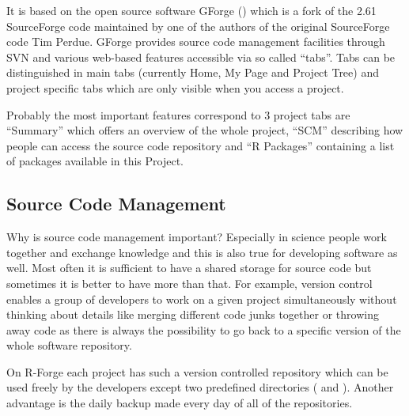 It is based 
on the open source software GForge (\cite{manual:gforge}) which is a
fork of the 2.61 SourceForge code maintained by one of the authors of
the original SourceForge code Tim Perdue. GForge provides source code
management facilities through SVN and various web-based features
accessible via so called ``tabs''. Tabs can be distinguished in main
tabs (currently Home, My Page and Project Tree) and project specific
tabs which are only visible when you access a project.



Probably the most important features correspond to 3 project tabs are
``Summary'' which offers an overview of the whole project, ``SCM''
describing how people can access the source code repository and ``R
Packages'' containing a list of packages available in this Project.

\subsection{Source Code Management}

Why is source code management important? Especially in science people
work together and exchange knowledge and 
this is also true for developing software as well. Most often it is
sufficient to have a shared storage for source code but sometimes it
is better to have more than that. For example, version control enables
a group of developers to work on a given project simultaneously
without thinking about details like merging different code junks
together or throwing away code as there is always the possibility to
go back to a specific version of the whole software repository.

On R-Forge each project has such a version controlled repository which
can be used freely by the developers except two predefined directories
( and ). Another advantage is the daily backup
made every day of all of the repositories.


